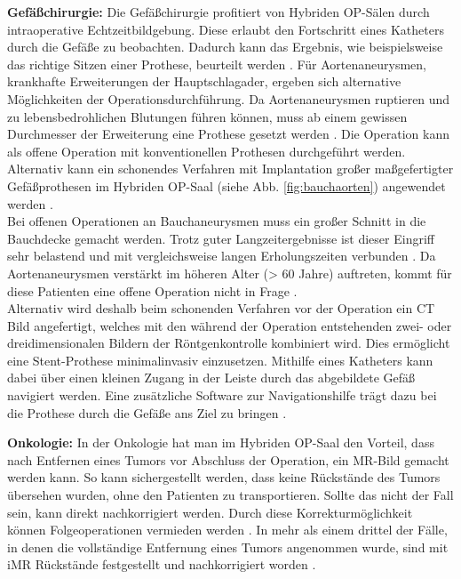 \textbf{Gefäßchirurgie:}
Die Gefäßchirurgie profitiert von Hybriden OP-Sälen durch intraoperative Echtzeitbildgebung. Diese erlaubt den Fortschritt eines Katheters durch die Gefäße zu beobachten. Dadurch kann das Ergebnis, wie beispielsweise das richtige Sitzen einer Prothese, beurteilt werden \cite{DresdnerUniklinikum,TickendeBombeImBauch}. Für Aortenaneurysmen, krankhafte Erweiterungen der Hauptschlagader, ergeben sich alternative Möglichkeiten der Operationsdurchführung. Da Aortenaneurysmen ruptieren und zu lebensbedrohlichen Blutungen führen können, muss ab einem gewissen Durchmesser der Erweiterung eine Prothese gesetzt werden \cite{Aortenaneurysma}. Die Operation kann als offene Operation mit konventionellen Prothesen durchgeführt werden. Alternativ kann ein schonendes Verfahren mit Implantation großer maßgefertigter Gefäßprothesen im Hybriden OP-Saal (siehe Abb. \ref{fig:bauchaorten}) angewendet werden \cite{DresdnerUniklinikum}. \\
Bei offenen Operationen an Bauchaneurysmen muss ein großer Schnitt in die Bauchdecke gemacht werden. Trotz guter Langzeitergebnisse ist dieser Eingriff sehr belastend und mit vergleichsweise langen Erholungszeiten verbunden \cite{TickendeBombeImBauch}. Da Aortenaneurysmen verstärkt im höheren Alter (> 60 Jahre) auftreten, kommt für diese Patienten eine offene Operation nicht in Frage \cite{Aortenaneurysma}. \\
Alternativ wird deshalb beim schonenden Verfahren vor der Operation ein CT Bild angefertigt, welches mit den während der Operation entstehenden zwei- oder dreidimensionalen Bildern der Röntgenkontrolle kombiniert wird. Dies ermöglicht eine Stent-Prothese minimalinvasiv einzusetzen. Mithilfe eines Katheters kann dabei über einen kleinen Zugang in der Leiste durch das abgebildete Gefäß navigiert werden. Eine zusätzliche Software zur Navigationshilfe trägt dazu bei die Prothese durch die Gefäße ans Ziel zu bringen \cite{DresdnerUniklinikum,TickendeBombeImBauch}.

\textbf{Onkologie:}
In der Onkologie hat man im Hybriden OP-Saal den Vorteil, dass nach Entfernen eines Tumors vor Abschluss der Operation, ein MR-Bild gemacht werden kann. So kann sichergestellt werden, dass keine Rückstände des Tumors übersehen wurden, ohne den Patienten zu transportieren. Sollte das nicht der Fall sein, kann direkt nachkorrigiert werden. Durch diese Korrekturmöglichkeit können Folgeoperationen vermieden werden \cite{AerzteZeitung}. In mehr als einem drittel der Fälle, in denen die vollständige Entfernung eines Tumors angenommen wurde, sind mit iMR Rückstände festgestellt und nachkorrigiert worden \cite{BrainShiftInTumorResection}.

